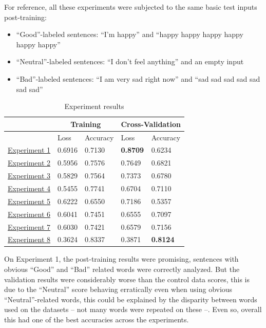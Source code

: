 \documentclass[review]{elsarticle} %
\begin{document}
For reference, all these experiments were subjected to the same basic test inputs post-training:
\begin{itemize}
	\item ``Good''-labeled sentences: ``I'm happy'' and ``happy happy happy happy happy happy''
	\item ``Neutral''-labeled sentences: ``I don't feel anything'' and an empty input
	\item ``Bad''-labeled sentences: ``I am very sad right now'' and ``sad sad sad sad sad sad sad''
\end{itemize}
\begin{table}[!h]
	\caption{Experiment results}
	\vspace{0.5cm}
	\centering
	\begin{tabular}[t]{|l|l|l|l|l|}
	\hline
	\multicolumn{1}{|c|}{} & \multicolumn{2}{c|}{Training} & \multicolumn{2}{c|}{Cross-Validation}
	\\ \hline
	\ & Loss & Accuracy & Loss & Accuracy
	\\ \hline
	\hyperref[exp1]{Experiment 1} & 0.6916 & 0.7130 & \textbf{0.8709} & 0.6234
	\\ \hline
	\hyperref[exp2]{Experiment 2} & 0.5956 & 0.7576 & 0.7649 & 0.6821
	\\ \hline
	\hyperref[exp3]{Experiment 3} & 0.5829 & 0.7564 & 0.7373 & 0.6780
	\\ \hline
	\hyperref[exp4]{Experiment 4} & 0.5455 & 0.7741 & 0.6704 & 0.7110
	\\ \hline
	\hyperref[exp6]{Experiment 5} & 0.6222 & 0.6550 & 0.7186 & 0.5357
	\\ \hline
	\hyperref[exp7]{Experiment 6} & 0.6041 & 0.7451 & 0.6555 & 0.7097
	\\ \hline
	\hyperref[exp8]{Experiment 7} & 0.6030 & 0.7421 & 0.6579 & 0.7156
	\\ \hline
	\hyperref[exp9]{Experiment 8} & 0.3624 & 0.8337 & 0.3871 & \textbf{0.8124}
	\\ \hline
	\end{tabular}
\end{table}
\pagebreak

On Experiment 1, the post-training results were promising, sentences with obvious ``Good'' and ``Bad'' related words were correctly analyzed. But the validation results were considerably worse than the control data scores, this is due to the ``Neutral'' score behaving erratically even when using obvious ``Neutral''-related words, this could be explained by the disparity between words used on the datasets -- not many words were repeated on these --. Even so, overall this had one of the best accuracies across the experiments.
\end{document}
